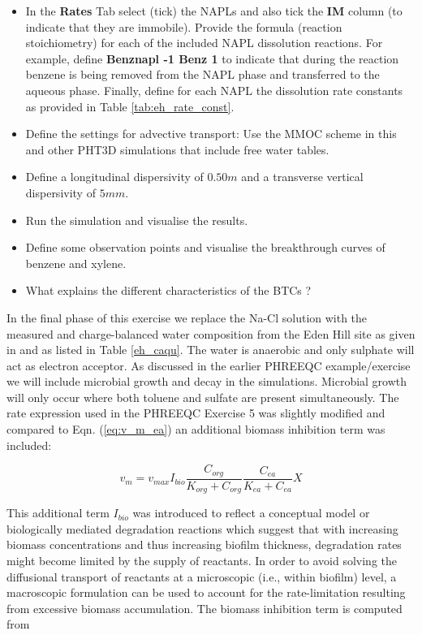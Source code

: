\begin{itemize}
\item In the {\color{red} \textbf{Rates}} Tab select (tick) the NAPLs and also
tick the {\color{red} \textbf{IM}} column (to indicate that they are immobile).
Provide the formula (reaction stoichiometry) for each of the included NAPL 
dissolution reactions. For example, define {\color{red} \textbf{Benznapl -1 Benz 1}} to indicate that during the reaction benzene is being removed from the NAPL phase and transferred to the aqueous phase. 
Finally, define for each NAPL the dissolution rate constants as provided 
in Table \ref{tab:eh_rate_const}.

\item Define the settings for advective transport: Use the MMOC scheme in this and other 
PHT3D simulations that include free water tables. 

\item Define a longitudinal dispersivity of $0.50 m$ and a transverse vertical 
dispersivity of $5mm$.

\item Run the simulation and visualise the results. 

\item Define some observation points and visualise the breakthrough curves
of benzene and xylene.

\item What explains the different characteristics of the BTCs ?

\end{itemize}

In the final phase of this exercise we replace the Na-Cl solution
with the measured and charge-balanced water composition from the Eden Hill 
site as given in \cite{prommer_jch} and as listed in Table \ref{eh_caqu}.
The water is anaerobic and only sulphate will act as electron acceptor. 
As discussed in the earlier PHREEQC example/exercise we will include 
microbial growth and decay in the simulations. Microbial growth
will only occur where both toluene and sulfate are present simultaneously.
The rate expression used in the PHREEQC Exercise 5 was slightly 
modified and compared to Eqn. (\ref{eq:v_m_ea}) an additional biomass 
inhibition term was included:

\begin{equation}
v_{m} = v_{max} I_{bio} \frac{C_{org}}{K_{org} + C_{org}} \frac{C_{ea}}{K_{ea} + C_{ea}} X
\end{equation}

This additional term $I_{bio}$ was introduced to reflect a conceptual model
or biologically mediated degradation reactions which suggest that with increasing 
biomass concentrations and thus increasing biofilm thickness, 
degradation rates might become limited by the supply of reactants. 
In order to avoid solving the diffusional transport of reactants 
at a microscopic (i.e., within biofilm) level, a macroscopic formulation 
can be used to account for the rate-limitation resulting 
from excessive biomass accumulation. 
The biomass inhibition term is computed from

